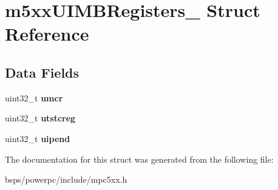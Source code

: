 \hypertarget{structm5xxUIMBRegisters__}{}\section{m5xx\+U\+I\+M\+B\+Registers\+\_\+ Struct Reference}
\label{structm5xxUIMBRegisters__}
\subsection*{Data Fields}
\begin{DoxyCompactItemize}
\item 
\mbox{\label{structm5xxUIMBRegisters___aa61bf1a52fa869f1511095adebf8adb1}} 
uint32\+\_\+t {\bfseries umcr}
\item 
\mbox{\label{structm5xxUIMBRegisters___abd1c5887cff9147ad9bff4d53fde3b33}} 
uint32\+\_\+t {\bfseries utstcreg}
\item 
\mbox{\label{structm5xxUIMBRegisters___ad8e6436fae19e5ada0ed8b9a70bf7128}} 
uint32\+\_\+t {\bfseries uipend}
\end{DoxyCompactItemize}


The documentation for this struct was generated from the following file\+:\begin{DoxyCompactItemize}
\item 
bsps/powerpc/include/mpc5xx.\+h\end{DoxyCompactItemize}
